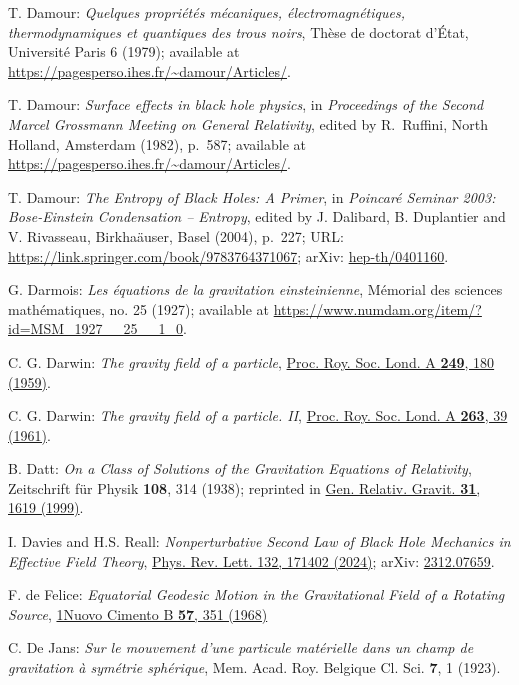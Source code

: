 \begin{thebibliography}{123}
T. Damour: {\em Quelques propri\'et\'es m\'ecaniques, \'electromagn\'etiques,
thermo\-dy\-na\-mi\-ques et quantiques des trous noirs},
Th\`ese de doctorat d'\'Etat, Universit\'e Paris 6 (1979); available at
\url{https://pagesperso.ihes.fr/~damour/Articles/}.

T. Damour: {\em Surface effects in black hole physics},
in {\em Proceedings of the Second Marcel Grossmann Meeting on General
Relativity},
edited by R.~Ruffini, North Holland, Amsterdam (1982), p.~587; available at
\url{https://pagesperso.ihes.fr/~damour/Articles/}.

T. Damour: {\em The Entropy of Black Holes: A Primer},
in {\em Poincaré Seminar 2003: Bose-Einstein Condensation -- Entropy},
edited by J. Dalibard, B. Duplantier and V. Rivasseau, Birkha\"auser, Basel (2004),
p.~227;
URL: \url{https://link.springer.com/book/9783764371067};
arXiv: \href{https://arxiv.org/abs/hep-th/0401160}{hep-th/0401160}.

G. Darmois:
{\em Les équations de la gravitation einsteinienne},
Mémorial des sciences mathématiques, no. 25 (1927); available at
\url{https://www.numdam.org/item/?id=MSM_1927__25__1_0}.

C. G. Darwin: {\em The gravity field of a particle},
\href{https://doi.org/10.1098/rspa.1959.0015}{Proc. Roy. Soc. Lond. A {\bf 249}, 180 (1959)}.

C. G. Darwin: {\em The gravity field of a particle. II},
\href{https://doi.org/10.1098/rspa.1961.0142}{Proc. Roy. Soc. Lond. A {\bf 263}, 39 (1961)}.

B. Datt:
{\em On a Class of Solutions of the Gravitation Equations of Relativity},
Zeitschrift für Physik {\bf 108}, 314 (1938);
reprinted in
\href{https://doi.org/10.1023/A:1026742707143}{Gen. Relativ. Gravit. {\bf 31}, 1619 (1999)}.

I. Davies and H.S. Reall:
{\em Nonperturbative Second Law of Black Hole Mechanics in Effective Field Theory},
\href{https://doi.org/10.1103/PhysRevLett.132.171402}{Phys. Rev. Lett. 132, 171402 (2024)};
arXiv: \href{https://arxiv.org/abs/2312.07659}{2312.07659}.

F. de Felice:
{\em Equatorial Geodesic Motion in the Gravitational Field of a Rotating Source},
\href{https://doi.org/10.1007/BF02710207}{1Nuovo Cimento B {\bf 57}, 351 (1968)}

C. De Jans:
\emph{Sur le mouvement d'une particule matérielle dans un champ de gravitation à symétrie sphérique},
Mem. Acad. Roy. Belgique Cl. Sci. {\bf 7}, 1 (1923).


\end{thebibliography}

